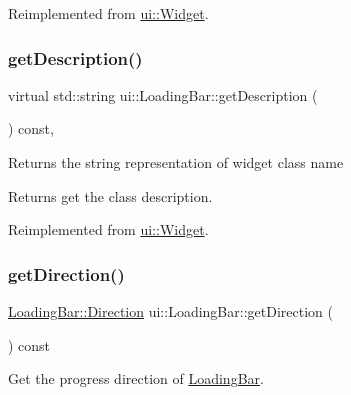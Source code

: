 Reimplemented from \hyperlink{classui_1_1Widget_ad85abdaa9133dc6b8efc32670ae9b93f}{ui\+::\+Widget}.

\mbox{\label{classui_1_1LoadingBar_abf92eb9c1275d45339da7fdee00d4fcd}} 
\subsubsection{\texorpdfstring{get\+Description()}{getDescription()}\hspace{0.1cm}{\footnotesize\ttfamily [2/2]}}
{\footnotesize\ttfamily virtual std\+::string ui\+::\+Loading\+Bar\+::get\+Description (\begin{DoxyParamCaption}{ }\end{DoxyParamCaption}) const\hspace{0.3cm}{\ttfamily [override]}, {\ttfamily [virtual]}}

Returns the string representation of widget class name \begin{DoxyReturn}{Returns}
get the class description. 
\end{DoxyReturn}


Reimplemented from \hyperlink{classui_1_1Widget_ad85abdaa9133dc6b8efc32670ae9b93f}{ui\+::\+Widget}.

\mbox{\label{classui_1_1LoadingBar_ab73ebf55cb97d33a82428f96923969ca}} 
\subsubsection{\texorpdfstring{get\+Direction()}{getDirection()}\hspace{0.1cm}{\footnotesize\ttfamily [1/2]}}
{\footnotesize\ttfamily \hyperlink{classui_1_1LoadingBar_a4407b3ce72891a78755e25d765e25063}{Loading\+Bar\+::\+Direction} ui\+::\+Loading\+Bar\+::get\+Direction (\begin{DoxyParamCaption}{ }\end{DoxyParamCaption}) const}

Get the progress direction of \hyperlink{classui_1_1LoadingBar}{Loading\+Bar}.

